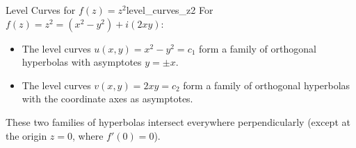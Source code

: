 \begin{example}{Level Curves for $f(z) = z^2$}{level_curves_z2}
For $f(z) = z^2 = (x^2 - y^2) + i(2xy)$:
\begin{itemize}
    \item The level curves $u(x, y) = x^2 - y^2 = c_1$ form a family of orthogonal hyperbolas with asymptotes $y = \pm x$.
    \item The level curves $v(x, y) = 2xy = c_2$ form a family of orthogonal hyperbolas with the coordinate axes as asymptotes.
\end{itemize}
These two families of hyperbolas intersect everywhere perpendicularly (except at the origin $z=0$, where $f'(0) = 0$).
\end{example}
